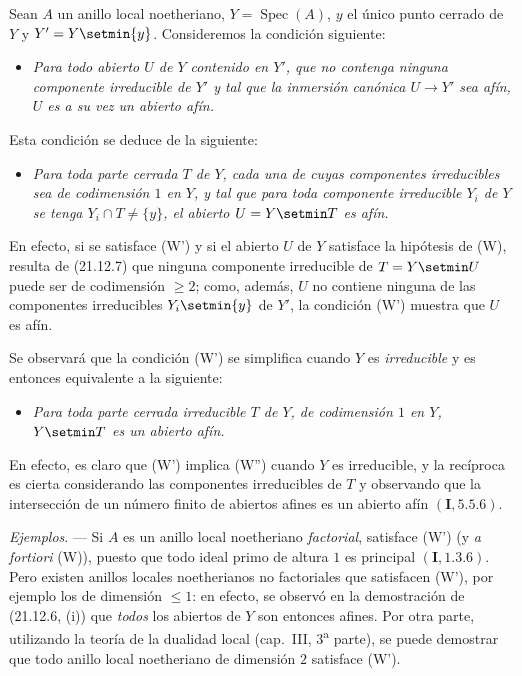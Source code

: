 \begin{env}[21.12.8]
\label{IV.21.12.8}
Sean $A$ un anillo local noetheriano, $Y=\operatorname{Spec}(A)$, $y$ el único punto
cerrado de $Y$ y $Y'=Y\setmin\{y\}$. Consideremos la condición siguiente:
\begin{itemize}
  \item[\textup{(W)}] \emph{Para todo abierto $U$ de $Y$ contenido en $Y'$, que no
  contenga ninguna componente irreducible de $Y'$ y tal que la inmersión canónica
  $U\to Y'$ sea afín, $U$ es a su vez un abierto afín.}
\end{itemize}
Esta condición se deduce de la siguiente:
\begin{itemize}
  \item[\textup{(W')}] \emph{Para toda parte cerrada $T$ de $Y$, cada una de cuyas componentes
  irreducibles sea de codimensión $1$ en $Y$, y tal que para toda componente
  irreducible $Y_i$ de $Y$ se tenga $Y_i\cap T\ne\{y\}$, el abierto $U=Y\setmin T$ es afín.}
\end{itemize}
En efecto, si se satisface (W') y si el abierto $U$ de $Y$ satisface la hipótesis de (W),
resulta de (21.12.7) que ninguna componente irreducible de $T=Y\setmin U$ puede ser de
codimensión $\geq2$; como, además, $U$ no contiene ninguna de las componentes
irreducibles $Y_i\setmin\{y\}$ de $Y'$, la condición (W') muestra que $U$ es afín.

Se observará que la condición (W') se simplifica cuando $Y$ es \emph{irreducible} y es
entonces equivalente a la siguiente:
\begin{itemize}
  \item[\textup{(W'')}] \emph{Para toda parte cerrada irreducible $T$ de $Y$, de
  codimensión $1$ en $Y$, $Y\setmin T$ es un abierto afín.}
\end{itemize}
En efecto, es claro que (W') implica (W'') cuando $Y$ es irreducible, y la
recíproca es cierta considerando las componentes irreducibles de $T$ y observando
que la intersección de un número finito de abiertos afines es un abierto afín
$(\mathbf I, 5.5.6)$.
\end{env}

\begin{env}[21.12.9]
\label{IV.21.12.9}
\emph{Ejemplos}. ---
Si $A$ es un anillo local noetheriano \emph{factorial}, satisface (W') (y
\emph{a fortiori} (W)), puesto que todo ideal primo de altura $1$ es principal
$(\mathbf I, 1.3.6)$. Pero existen anillos locales noetherianos no factoriales que
satisfacen (W'), por ejemplo los de dimensión $\leq1$: en efecto, se observó en la
demostración de (21.12.6, (i)) que \emph{todos} los abiertos de $Y$ son entonces afines.
Por otra parte, utilizando la teoría de la dualidad local (cap.~III,
3\textsuperscript{a} parte), se puede demostrar que todo anillo local noetheriano de dimensión $2$
satisface (W').
\end{env}

